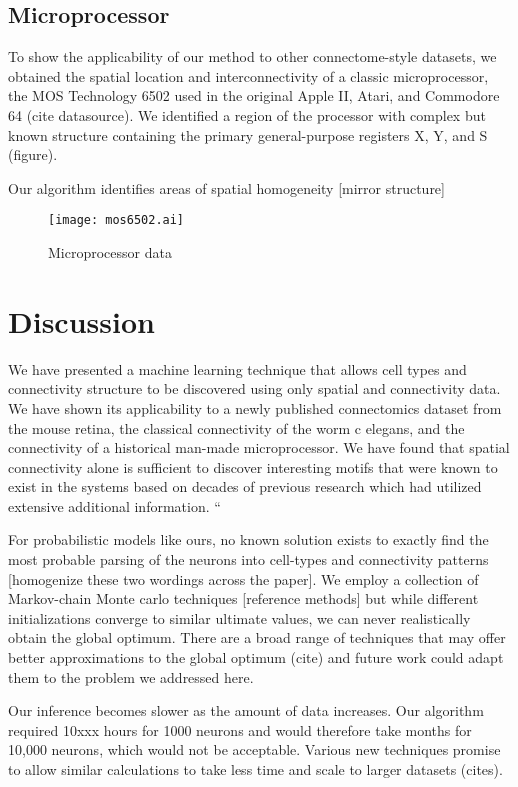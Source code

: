 \documentclass{article}
\begin{document}
\subsection{Microprocessor}

To show the applicability of our method to other connectome-style
datasets, we obtained the spatial location and interconnectivity of a
classic microprocessor, the MOS Technology 6502 used in the original
Apple II, Atari, and Commodore 64 (cite datasource). We identified a
region of the processor with complex but known structure containing
the primary general-purpose registers X, Y, and S (figure).

Our algorithm identifies areas of spatial homogeneity 
[mirror structure] 


\begin{figure}
  \centering 
  \centerline{\texttt{[image: mos6502.ai]}}
  \caption{Microprocessor data}
\end{figure}


\section{Discussion}
We have presented a machine learning technique that allows cell types
and connectivity structure to be discovered using only spatial and
connectivity data. We have shown its applicability to a newly
published connectomics dataset from the mouse retina, the classical
connectivity of the worm c elegans, and the connectivity of a
historical man-made microprocessor. We have found that spatial
connectivity alone is sufficient to discover interesting motifs that
were known to exist in the systems based on decades of previous
research which had utilized extensive additional information. “

For probabilistic models like ours, no known solution exists to
exactly find the most probable parsing of the neurons into cell-types
and connectivity patterns [homogenize these two wordings across the
paper]. We employ a collection of Markov-chain Monte carlo techniques
[reference methods] but while different initializations converge to
similar ultimate values, we can never realistically obtain the global
optimum. There are a broad range of techniques that may offer better
approximations to the global optimum (cite) and future work could
adapt them to the problem we addressed here.

Our inference becomes slower as the amount of data increases. Our
algorithm required 10xxx hours for 1000 neurons and would therefore
take months for 10,000 neurons, which would not be acceptable. Various
new techniques promise to allow similar calculations to take less time
and scale to larger datasets (cites).
\end{document}
